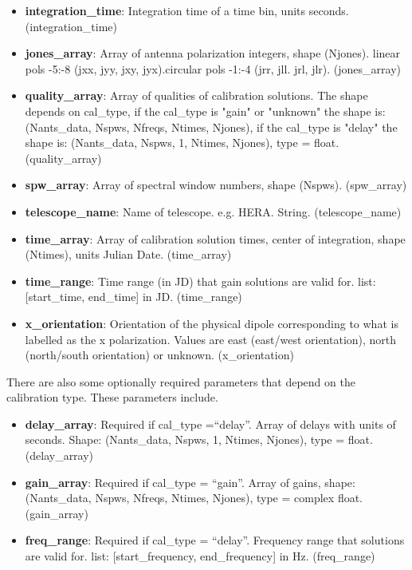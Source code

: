 \documentclass[11pt, oneside, english]{article}   	%
\begin{document}
\begin{itemize}
\item{\textbf{integration\_time}: Integration time of a time bin, units seconds. (integration\_time)}
\item{\textbf{jones\_array}: Array of antenna polarization integers, shape
    (Njones). linear pols -5:-8 (jxx, jyy, jxy, jyx).circular pols -1:-4 (jrr,
    jll. jrl, jlr). (jones\_array)}
\item{\textbf{quality\_array}: Array of qualities of calibration solutions. The
    shape depends on cal\_type, if the cal\_type is "gain" or "unknown" the shape is:
    (Nants\_data, Nspws, Nfreqs, Ntimes, Njones), if the cal\_type is "delay" the shape is: 
    (Nants\_data, Nspws, 1, Ntimes, Njones), type = float. (quality\_array)}
\item{\textbf{spw\_array}: Array of spectral window numbers, shape (Nspws). (spw\_array)}
\item{\textbf{telescope\_name}: Name of telescope. e.g. HERA. String. (telescope\_name)}
\item{\textbf{time\_array}: Array of calibration solution times, center of integration, shape
    (Ntimes), units Julian Date. (time\_array)}
\item{\textbf{time\_range}: Time range (in JD) that gain solutions are valid
    for. list: [start\_time, end\_time] in JD. (time\_range)}
\item{\textbf{x\_orientation}: Orientation of the physical dipole corresponding
    to what is labelled as the x polarization. Values are east (east/west
    orientation), north (north/south orientation) or unknown. (x\_orientation)}
\end{itemize}

There are also some optionally required parameters that depend on the
calibration type. These parameters include.
\begin{itemize}
\item{\textbf{delay\_array}: Required if cal\_type =``delay''. Array of delays with
    units of seconds. Shape: (Nants\_data, Nspws, 1, Ntimes, Njones), type = float. (delay\_array)}
\item{\textbf{gain\_array}: Required if cal\_type = ``gain''. Array of gains, 
    shape: (Nants\_data, Nspws, Nfreqs, Ntimes, Njones), type = complex float. (gain\_array)}
\item{\textbf{freq\_range}: Required if cal\_type = ``delay''. Frequency range that
   solutions are valid for. list: [start\_frequency, end\_frequency] in Hz. (freq\_range)}
\end{itemize}
\end{document}
